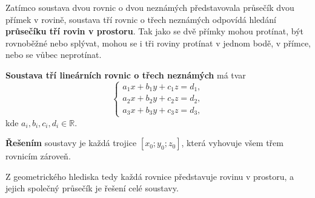 \documentclass[12pt,a4paper]{article}
\begin{document}
Zatímco soustava dvou rovnic o dvou neznámých představovala průsečík dvou přímek v rovině,  
soustava tří rovnic o třech neznámých odpovídá hledání \textbf{průsečíku tří rovin v prostoru}.  
Tak jako se dvě přímky mohou protínat, být rovnoběžné nebo splývat,  
mohou se i tři roviny protínat v jednom bodě, v přímce, nebo se vůbec neprotínat.

\begin{definitionbox}
\textbf{Soustava tří lineárních rovnic o třech neznámých} má tvar
\[
\begin{cases}
a_1x + b_1y + c_1z = d_1,\\
a_2x + b_2y + c_2z = d_2,\\
a_3x + b_3y + c_3z = d_3,
\end{cases}
\]
kde \(a_i, b_i, c_i, d_i \in \mathbb{R}\).

\medskip
\textbf{Řešením} soustavy je každá trojice \([x_0; y_0; z_0]\), která vyhovuje všem třem rovnicím zároveň.
\end{definitionbox}

\noindent
Z geometrického hlediska tedy každá rovnice představuje rovinu v prostoru,  
a jejich společný průsečík je řešení celé soustavy.
\end{document}
